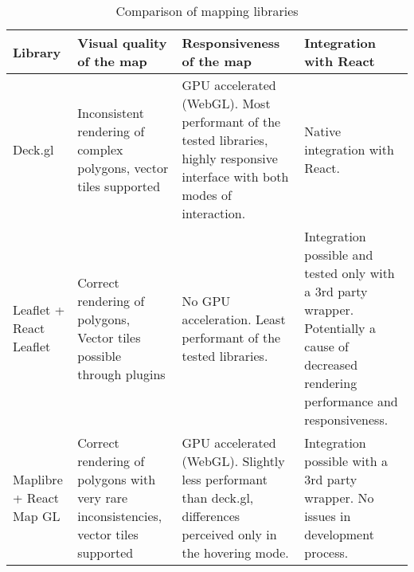 \begin{table}[H]
	\caption{Comparison of mapping libraries}
	\label{tab:map library comparison}
	\centering
	\begin{tabular}{ | L{0.13\textwidth} | L{0.25\textwidth} | L{0.25\textwidth} | L{0.25\textwidth} | }
		\hline
		\textbf{Library}
		& \textbf{Visual quality of the map}
		& \textbf{Responsiveness of the map}
		& \textbf{Integration with React}
		\\
		\hline
		\hline
		Deck.gl
		& Inconsistent rendering of complex polygons, vector tiles supported
		& GPU accelerated (WebGL). Most performant of the tested libraries,
		highly responsive interface with both modes of interaction.
		& Native integration with React.
		\\
		\hline
		Leaflet + React Leaflet
		& Correct rendering of polygons, Vector tiles possible through plugins
		& No GPU acceleration. Least performant of the tested libraries.
		& Integration possible and tested only with a 3rd party wrapper.
		Potentially a cause of decreased rendering performance and responsiveness.
		\\
		\hline
		Maplibre + React Map GL
		& Correct rendering of polygons with very rare inconsistencies, vector tiles supported
		& GPU accelerated (WebGL). Slightly less performant than deck.gl,
		differences perceived only in the hovering mode.
		& Integration possible with a 3rd party wrapper.
		No issues in development process.
		\\
		\hline
	\end{tabular}
\end{table}
